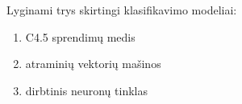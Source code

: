 
Lyginami trys skirtingi klasifikavimo modeliai:
\begin{enumerate}
\item C4.5 sprendimų medis
\item atraminių vektorių mašinos
\item dirbtinis neuronų tinklas
\end{enumerate}


